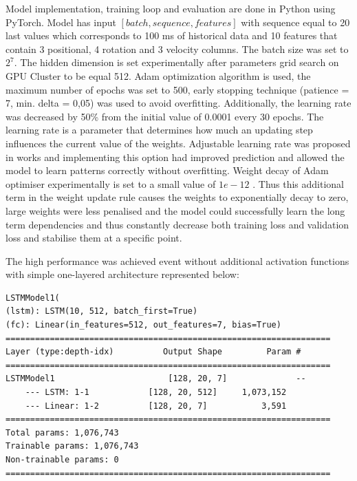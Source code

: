 Model implementation, training loop and evaluation are done in Python using PyTorch. Model has input $[batch, sequence, features]$ with sequence equal to 20 last values which corresponds to 100 ms of historical data and 10 features that contain 3 positional, 4 rotation and 3 velocity columns. The batch size was set to $2^{7}$. The hidden dimension is set experimentally after parameters grid search on GPU Cluster to be equal 512. Adam optimization algorithm is used, the maximum number of epochs was set to 500, early stopping technique (patience = 7, min. delta = 0,05) was used to avoid overfitting. Additionally, the learning rate was decreased by 50\% from the initial value of 0.0001 every 30 epochs. The learning rate is a parameter that determines how much an updating step influences the current value of the weights. Adjustable learning rate was proposed in works \cite{delay_compensation_360, telepresence} and implementing this option had improved prediction and allowed the model to learn patterns correctly without overfitting. Weight decay of Adam optimiser experimentally is set to a small value of $1e-12$ . Thus this additional term in the weight update rule causes the weights to exponentially decay to zero, large weights were less penalised and the model could successfully learn the long term dependencies and thus constantly decrease both training loss and validation loss  and stabilise them at a specific point. 

The high performance was achieved event without additional activation functions with simple one-layered architecture represented below:
\begin{lstlisting}[caption={One-layered LSTM with sliding window},captionpos=b]
LSTMModel1(
(lstm): LSTM(10, 512, batch_first=True)
(fc): Linear(in_features=512, out_features=7, bias=True)
==================================================================
Layer (type:depth-idx)          Output Shape         Param #
==================================================================
LSTMModel1                       [128, 20, 7]              --
	--- LSTM: 1-1            [128, 20, 512]     1,073,152
	--- Linear: 1-2          [128, 20, 7]           3,591
==================================================================
Total params: 1,076,743
Trainable params: 1,076,743
Non-trainable params: 0
==================================================================
\end{lstlisting}


